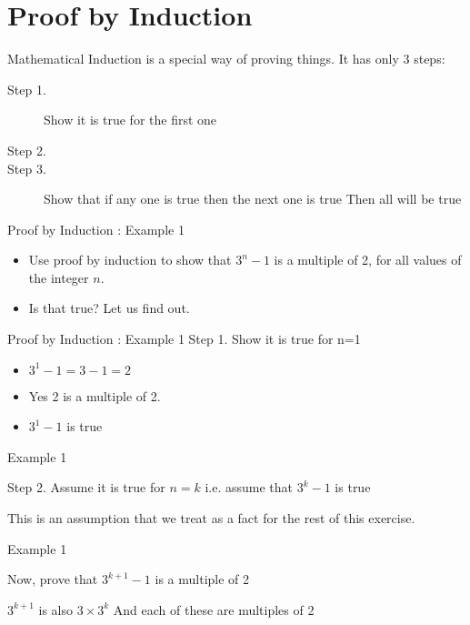 

\section{Proof by Induction}

Mathematical Induction is a special way of proving things. It has only 3 steps:

\begin{description}
\item[Step 1.] Show it is true for the first one
\item[Step 2.]
\item[Step 3.] Show that if any one is true then the next one is true
Then all will be true
\end{description}



{Proof by Induction : Example 1}

\begin{itemize}
\item Use proof by induction to show that $3^n-1$ is a multiple of 2, for all values of the integer $n$.
\item Is that true? Let us find out.
\end{itemize} 


{Proof by Induction : Example 1}
Step 1. Show it is true for n=1

\begin{itemize}
\item $3^1-1 = 3-1 = 2$
\item Yes 2 is a multiple of 2. 
\item $3^1-1$ is true
\end{itemize}



{Example 1}

Step 2. Assume it is true for $n=k$ i.e. assume that $3^k-1$ is true

This is an assumption that we treat 
as a fact for the rest of this exercise.




{Example 1}

Now, prove that $3^{k+1}-1$ is a multiple of 2
 
 
$3^{k+1}$ is also $3\times3^{k}$
And each of these are multiples of 2

